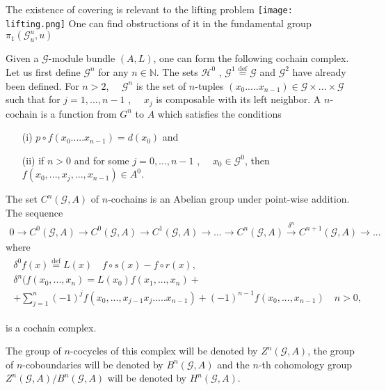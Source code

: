 \documentclass{beamer}
\theoremstyle{plain}
\newcommand{\G}{\mathcal{G}}
\newcommand{\N}{\mathbb{N}}                  %
\renewcommand{\H}{\mathcal{H}}               %
\newcommand{\bean}{\begin{eqnarray*}}
\newcommand{\eean}{\end{eqnarray*}}
\newcommand{\bydef}{\stackrel{\mathrm{def}}{=}}
\begin{document}
\begin{frame}

The existence of covering is relevant to the lifting problem
	\newline
\texttt{[image: lifting.png]}
\newline
	One can find obstructions of it in the fundamental group $\pi_1\left( \G^u_u, u \right)$

\end{frame}	
\begin{frame}
	Given a $\G$-module bundle $( A , L )$, one can form the following cochain complex. Let
	us first define $\G^n$ for any $n\in\N$. The sets $\H^0$ , $\G^1\bydef \G$ and $\G^2$ have already been defined. For $n> 2$, $\quad \G^n$ is the set of $n$-tuples $(x_0 . . . . . x_{n-1}) \in \G\times...\times \G$ such that for $
	j = 1 , . . . , n - 1$ , $\quad x_j$ is composable with its left  neighbor. A $n$-cochain is a function from $G^n$ to $A$ which satisfies the conditions
	\begin{enumerate}
		\item[(i)] $p\circ f(x_0 . . . . . x_{n-1}) = d(x_0)$ and
		\item[(ii)] if $n > 0$ and for some $j = 0, . . . , n - 1$ , $\quad x_0 \in \G^0$, then $f ( x_0, ..., x_j , ..., x_{n-1})\in A^0$.
	\end{enumerate}
	\end{frame}
	\begin{frame}
	The set $C^n\left(\G, A\right)$ of $n$-cochains is an Abelian group under point-wise addition. The
	sequence 
	\bean
	0 \to C^0\left( \G, A\right)\to C^0\left( \G, A\right)\to C^1\left( \G, A\right)\to...\to  C^n\left( \G, A\right) \xrightarrow{\delta^n} C^{n + 1}\left( \G, A\right)\to ...
	\eean
	where 
	\bean
	\begin{split}
		\delta^0f(x)\bydef L(x)\quad  f\circ s(x) - f \circ r ( x ),\\
		\delta^n(f(x_0 ,..., x_n) = L ( x_0 ) f ( x_1,..., x_n) +\\+ \sum_{j=1}^n (-1)^j
		f ( x_0 ,..., x_{j-1}x_j . . . . . x_{n-1})+(-1)^{n-1} f ( x_0 , . . . , x_{n-1}) \quad  n > 0,
	\end{split}
	\eean
	
	is a cochain complex.
	
\begin{definition}\label{groupoid_cocycle_defn}
	The group of $n$-cocycles of this complex will be denoted by $Z^n(\G,A)$,
	the group of $n$-coboundaries will be denoted by $B^n(\G,A)$ and the $n$-th cohomology group
	$Z^n(\G,A)/B^n(\G,A)$ will be denoted by $H^n(\G,A)$.
\end{definition}
\end{frame}
\end{document}
